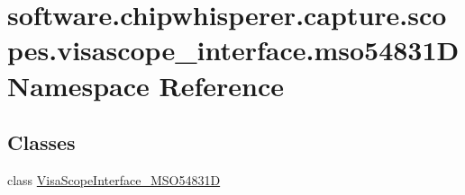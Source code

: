 \hypertarget{namespacesoftware_1_1chipwhisperer_1_1capture_1_1scopes_1_1visascope__interface_1_1mso54831D}{}\section{software.\+chipwhisperer.\+capture.\+scopes.\+visascope\+\_\+interface.\+mso54831\+D Namespace Reference}
\label{namespacesoftware_1_1chipwhisperer_1_1capture_1_1scopes_1_1visascope__interface_1_1mso54831D}
\subsection*{Classes}
\begin{DoxyCompactItemize}
\item 
class \hyperlink{classsoftware_1_1chipwhisperer_1_1capture_1_1scopes_1_1visascope__interface_1_1mso54831D_1_1VisaScopeInterface__MSO54831D}{Visa\+Scope\+Interface\+\_\+\+M\+S\+O54831\+D}
\end{DoxyCompactItemize}
